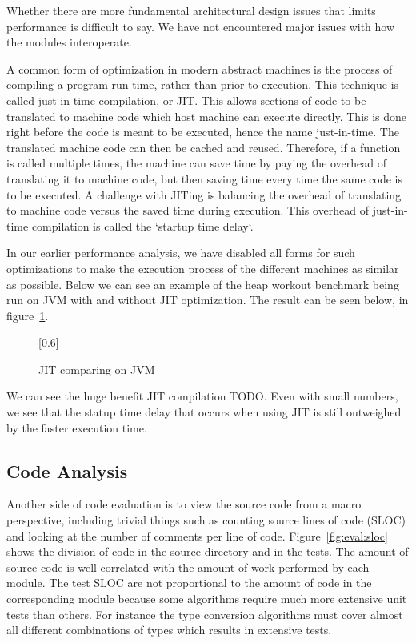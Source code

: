Whether there are more fundamental architectural design issues that limits
performance is difficult to say. We have not encountered major issues with how
the modules interoperate.


A common form of optimization in modern abstract machines is the process of
compiling a program run-time, rather than prior to execution. This technique is
called just-in-time compilation, or JIT. This allows sections of code to be
translated to machine code which host machine can execute directly. This is done
right before the code is meant to be executed, hence the name just-in-time. The
translated machine code can then be cached and reused. Therefore, if a function
is called multiple times, the machine can save time by paying the overhead of
translating it to machine code, but then saving time every time the same code is
to be executed. A challenge with JITing is balancing the overhead of translating
to machine code versus the saved time during execution. This overhead of
just-in-time compilation is called the `startup time delay`.

In our earlier performance analysis, we have disabled all forms for such
optimizations to make the execution process of the different machines as similar
as possible. Below we can see an example of the heap workout benchmark being run
on JVM with and without JIT optimization. The result can be seen below, in
figure~\ref{fig:eval:benchmark:jit}.

\begin{figure}[H]
  \centering
  \scalebox{0.8}[0.6]{}
  \caption{JIT comparing on JVM}
\label{fig:eval:benchmark:jit}
\end{figure}

We can see the huge benefit JIT compilation TODO. Even with small numbers, we
see that the statup time delay that occurs when using JIT is still outweighed
by the faster execution time.

\subsection{Code Analysis}

Another side of code evaluation is to view the source code from a macro
perspective, including trivial things such as counting source lines of code
(SLOC) and looking at the number of comments per line of
code. Figure~\ref{fig:eval:sloc} shows the division of code in the source
directory and in the tests. The amount of source code is well correlated with
the amount of work performed by each module. The test SLOC are not proportional
to the amount of code in the corresponding module because some algorithms
require much more extensive unit tests than others. For instance the type
conversion algorithms must cover almost all different combinations of types
which results in extensive tests.

